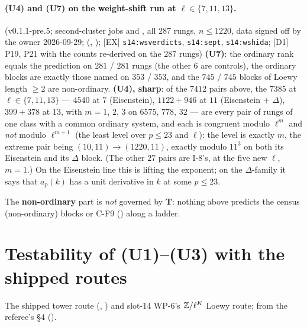 \documentclass[11pt]{article}
\newcommand{\Tu}{\mathbf{T}}                      %
\begin{document}
\paragraph{(U4) and (U7) on the weight-shift run at $\ell\in\{7,11,13\}$.} \COMP{} (v0.1.1-pre.5; second-cluster jobs  and ,
all $287$ rungs, $n\le1220$, data signed off by the owner 2026-09-29;  (,
); [EX] \texttt{s14:wsverdicts}, \texttt{s14:sept}, \texttt{s14:wshida}; [D1] P19, P21 with the counts re-derived on the
$287$ rungs) \textbf{(U7)}: the ordinary rank equals the prediction on $281$ / $281$ rungs (the other $6$ are controls), the ordinary blocks
are exactly those named on $353$ / $353$, and the $745$ / $745$ blocks of Loewy length $\ge2$ are non-ordinary. \textbf{(U4), sharp}: of the
$7412$ pairs above, the $7385$ at $\ell\in\{7,11,13\}$ --- $4540$ at $7$ (Eisenstein), $1122+946$ at $11$ (Eisenstein $+$ $\Delta$), $399+378$
at $13$, with $m=1$, $2$, $3$ on $6575$, $778$, $32$ --- are every pair of rungs of one class with a common ordinary system, and each is
congruent modulo $\ell^{m}$ and \emph{not} modulo $\ell^{m+1}$ (the least level over $p\le23$ and $\ell$): the level is exactly $m$, the extreme
pair being $(10,11)\to(1220,11)$, exactly modulo $11^{3}$ on both its Eisenstein and its $\Delta$ block. (The other $27$ pairs are
I-8's, at the five new $\ell$, $m=1$.) On the Eisenstein line this is lifting the exponent; on the $\Delta$-family it says that $a_p(k)$ has a
unit derivative in $k$ at some $p\le23$.

The \textbf{non-ordinary} part is \emph{not} governed by $\Tu$: nothing above predicts the census (non-ordinary) blocks or C-F9 () along a ladder.

\section{Testability of (U1)--(U3) with the shipped routes}\label{sec:u-test}

The shipped tower route (, ) and slot-14 WP-6's $\mathbb{Z}/\ell^{K}$ Loewy route; from the referee's
\S4 ().
\end{document}
